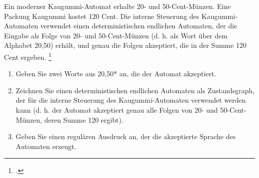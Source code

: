 \documentclass{lehramt-informatik-aufgabe}
\begin{document}

Ein moderner Kaugummi-Automat erhalte 20- und 50-Cent-Münzen. Eine
Packung Kaugummi kostet 120 Cent. Die interne Steuerung des
Kaugummi-Automaten verwendet einen deterministischen endlichen
Automaten, der die Eingabe als Folge von 20- und 50-Cent-Münzen (d. h.
als Wort über dem Alphabet {20,50}) erhält, und genau die Folgen
akzeptiert, die in der Summe 120 Cent ergeben.
\footcite{examen:46115:2021:03}

\begin{enumerate}


\item Geben Sie zwei Worte aus {20,50}* an, die der Automat akzeptiert.


\item Zeichnen Sie einen deterministischen endlichen Automaten als
Zustandsgraph, der für die interne Steuerung des Kaugummi-Automaten
verwendet werden kann (d. h. der Automat akzeptiert genau alle Folgen
von 20- und 50-Cent-Münzen, deren Summe 120 ergibt).


\item Geben Sie einen regulären Ausdruck an, der die akzeptierte Sprache
des Automaten erzeugt.
\end{enumerate}
\end{document}
